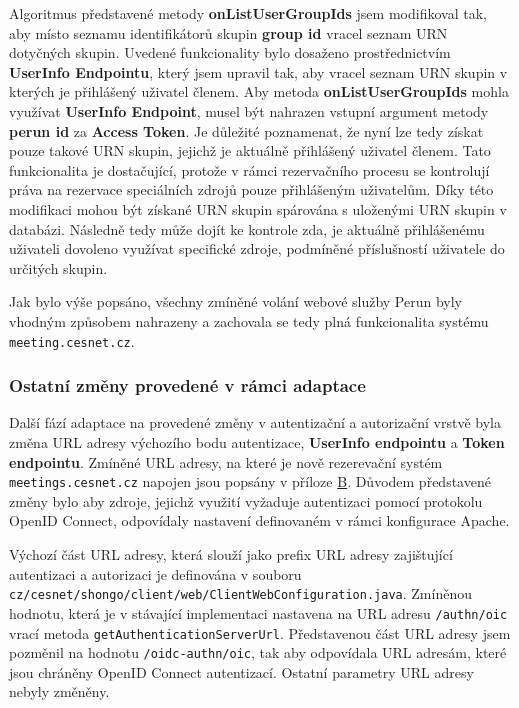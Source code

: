 \documentclass[
  printed, %
  twoside, %
  table,   %
  nolof,     %
  nolot,     %
]{fithesis3}
\begin{document}
Algoritmus představené metody \textbf{onListUserGroupIds} jsem modifikoval tak, aby místo seznamu identifikátorů skupin \textbf{group id} vracel seznam URN dotyčných skupin. Uvedené funkcionality bylo dosaženo prostřednictvím \textbf{UserInfo Endpointu}, který jsem upravil tak, aby vracel seznam URN skupin v kterých je přihlášený uživatel členem. Aby metoda \textbf{onListUserGroupIds} mohla využívat \textbf{UserInfo Endpoint}, musel být nahrazen vstupní argument metody \textbf{perun id} za \textbf{Access Token}. Je důležité poznamenat, že nyní lze tedy získat pouze takové URN skupin, jejichž je aktuálně přihlášený uživatel členem. Tato funkcionalita je dostačující, protože v rámci rezervačního procesu se kontrolují práva na rezervace speciálních zdrojů pouze přihlášeným uživatelům. Díky této modifikaci mohou být získané URN skupin spárována s uloženými URN skupin v databázi. Následně tedy může dojít ke kontrole zda, je aktuálně přihlášenému uživateli dovoleno využívat specifické zdroje, podmíněné příslušností uživatele do určitých skupin.

\par

Jak bylo výše popsáno, všechny zmíněné volání webové služby Perun byly vhodným způsobem nahrazeny a zachovala se tedy plná funkcionalita systému \texttt{meeting.cesnet.cz}.

\subsubsection{Ostatní změny provedené v rámci adaptace}
Další fází adaptace na provedené změny v autentizační a autorizační vrstvě byla změna URL adresy výchozího bodu autentizace, \textbf{UserInfo endpointu} a \textbf{Token endpointu}. Zmíněné URL adresy, na které je nově rezerevační systém \texttt{meetings.cesnet.cz} napojen jsou popsány v příloze \hyperref[oidcEndpoints]{B}. Důvodem představené změny bylo aby zdroje, jejichž využití vyžaduje autentizaci pomocí protokolu OpenID Connect, odpovídaly nastavení definovaném v rámci konfigurace Apache. \par


Výchozí část URL adresy, která slouží jako prefix URL adresy zajištující autentizaci a autorizaci je definována v souboru \texttt{cz/cesnet/shongo/client/web/ClientWebConfiguration.java}. Zmíněnou hodnotu, která je v stávající implementaci nastavena na URL adresu \texttt{/authn/oic} vrací metoda \texttt{getAuthenticationServerUrl}. Představenou část URL adresy jsem pozměnil na hodnotu \texttt{/oidc-authn/oic}, tak aby odpovídala URL adresám, které jsou chráněny OpenID Connect autentizací. Ostatní parametry URL adresy nebyly změněny. 
\par
\end{document}
